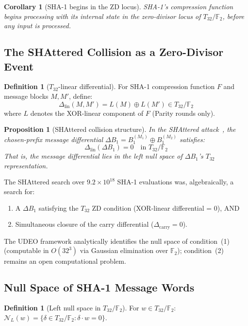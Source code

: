 \documentclass[runningheads]{llncs}
\theoremstyle{plain}
\newtheorem{corollary}[theorem]{Corollary}
\newtheorem{proposition}[theorem]{Proposition}
\theoremstyle{definition}
\newtheorem{definition}[theorem]{Definition}
\newcommand{\GFtwo}{\mathbb{F}_2}
\begin{document}
\begin{corollary}[SHA-1 begins in the ZD locus]
SHA-1's compression function begins processing with its internal state
in the zero-divisor locus of $T_{32}/\GFtwo$, before any input is processed.
\end{corollary}

\subsection{The SHAttered Collision as a Zero-Divisor Event}

\begin{definition}[$T_{32}$-linear differential]
For SHA-1 compression function $F$ and message blocks $M, M'$, define:
\[
\Delta_{\mathrm{lin}}(M, M') = L(M) \oplus L(M') \in T_{32}/\GFtwo
\]
where $L$ denotes the XOR-linear component of $F$ (Parity rounds only).
\end{definition}

\begin{proposition}[SHAttered collision structure]
\label{prop:shattered}
In the SHAttered attack~\cite{Stevens2017}, the chosen-prefix message
differential $\Delta B_1 = B_1^{(M_1)} \oplus B_1^{(M_2)}$ satisfies:
\[
\Delta_{\mathrm{lin}}(\Delta B_1) = 0 \quad \text{in } T_{32}/\GFtwo
\]
That is, the message differential lies in the left null space of $\Delta B_1$'s
$T_{32}$ representation.
\end{proposition}

The SHAttered search over $9.2 \times 10^{18}$ SHA-1 evaluations was,
algebraically, a search for:
\begin{enumerate}
\item A $\Delta B_1$ satisfying the $T_{32}$ ZD condition (XOR-linear differential = 0), AND
\item Simultaneous closure of the carry differential ($\Delta_{\mathrm{carry}} = 0$).
\end{enumerate}

The UDEO framework analytically identifies the null space of condition~(1)
(computable in $O(32^3)$ via Gaussian elimination over $\GFtwo$); condition~(2)
remains an open computational problem.

\subsection{Null Space of SHA-1 Message Words}

\begin{definition}[Left null space in $T_{32}/\GFtwo$]
For $w \in T_{32}/\GFtwo$:
$\mathcal{N}_L(w) = \{\delta \in T_{32}/\GFtwo : \delta \cdot w = 0\}$.
\end{definition}
\end{document}
